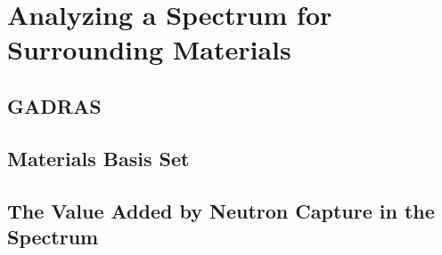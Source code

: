\chapter{Analyzing a Spectrum for Surrounding Materials}

\section{GADRAS}

\section{Materials Basis Set}

\section{The Value Added by Neutron Capture in the Spectrum}


